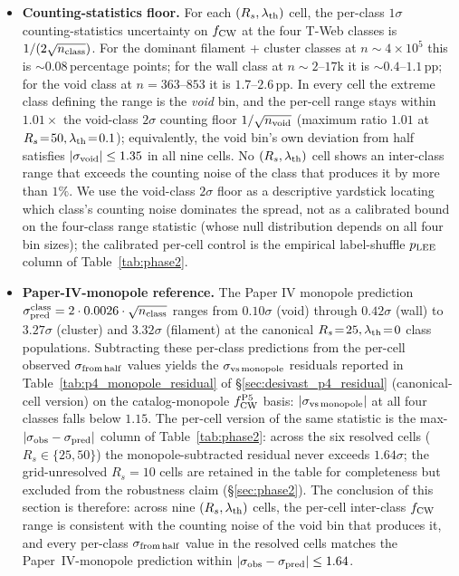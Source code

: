 \documentclass[aps,prd,twocolumn,superscriptaddress,showpacs,preprintnumbers,nofootinbib,longbibliography,floatfix]{revtex4-2}
\begin{document}
\begin{itemize}
\item \textbf{Counting-statistics floor.} For each $(R_s,
\lambda_{\rm th})$ cell, the per-class $1\sigma$ counting-statistics
uncertainty on $f_{\rm CW}$ at the four T-Web classes is
$1/(2\sqrt{n_{\rm class}})$. For the dominant filament + cluster
classes at $n \sim 4 \times 10^5$ this is
$\sim 0.08$\,percentage points; for the wall class at
$n \sim 2$--$17$k it is $\sim 0.4$--$1.1$\,pp; for the void class at
$n = 363$--$853$ it is
$1.7$--$2.6$\,pp. In every cell the extreme class defining the range
is the \emph{void} bin, and the per-cell range stays within
$1.01\times$ the void-class $2\sigma$ counting floor
$1/\sqrt{n_{\rm void}}$ (maximum
ratio $1.01$ at $R_s\!=\!50, \lambda_{\rm th}\!=\!0.1$); equivalently,
the void bin's own deviation from half satisfies
$|\sigma_{\rm void}| \le 1.35$ in all nine cells. No
$(R_s, \lambda_{\rm th})$ cell shows an
inter-class range that exceeds the counting noise of the class that
produces it by more than $1\%$. We use the void-class $2\sigma$ floor
as a descriptive yardstick locating which class's counting noise
dominates the spread, not as a calibrated bound on the four-class
range statistic (whose null distribution depends on all four bin
sizes); the calibrated per-cell control is the empirical
label-shuffle $p_{\rm LEE}$ column of Table~\ref{tab:phase2}.

\item \textbf{Paper-IV-monopole reference.} The Paper IV
monopole prediction $\sigma_{\rm pred}^{\rm class} = 2 \cdot 0.0026
\cdot \sqrt{n_{\rm class}}$ ranges from $0.10\sigma$ (void) through
$0.42\sigma$ (wall) to $3.27\sigma$ (cluster) and $3.32\sigma$
(filament) at the canonical $R_s\!=\!25, \lambda_{\rm th}\!=\!0$
class populations. Subtracting these per-class predictions from the
per-cell observed $\sigma_{\rm from\,half}$ values yields the
$\sigma_{\rm vs\,monopole}$ residuals reported in
Table~\ref{tab:p4_monopole_residual} of \S\ref{sec:desivast_p4_residual}
(canonical-cell version) on the catalog-monopole $f_{\rm CW}^{\rm P5}$
basis: $|\sigma_{\rm vs\,monopole}|$ at all four classes falls
below $1.15$. The per-cell version of the same statistic is the
max-$|\sigma_{\rm obs}-\sigma_{\rm pred}|$ column of
Table~\ref{tab:phase2}: across the six resolved cells ($R_s \in
\{25, 50\}$) the
monopole-subtracted residual never exceeds $1.64\sigma$; the
grid-unresolved $R_s\!=\!10$ cells are retained in the table for
completeness but excluded from the robustness claim
(\S\ref{sec:phase2}). The conclusion of
this section is therefore: across nine $(R_s, \lambda_{\rm th})$
cells, the per-cell inter-class $f_{\rm CW}$ range is consistent with
the counting noise of the void bin that produces it, and every
per-class
$\sigma_{\rm from\,half}$ value in the resolved cells matches the Paper~IV-monopole
prediction within
$|\sigma_{\rm obs}-\sigma_{\rm pred}| \le 1.64$.


\end{itemize}
\end{document}
